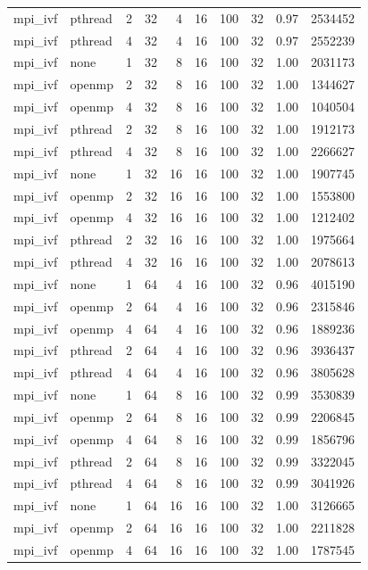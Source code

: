 \documentclass[a4paper]{article}
\begin{document}
{\begin{longtable}{lllrrrrrrr}
mpi\_ivf & pthread & 2 & 32 & 4 & 16 & 100 & 32 & 0.97 & 2534452 \\
mpi\_ivf & pthread & 4 & 32 & 4 & 16 & 100 & 32 & 0.97 & 2552239 \\
mpi\_ivf & none & 1 & 32 & 8 & 16 & 100 & 32 & 1.00 & 2031173 \\
mpi\_ivf & openmp & 2 & 32 & 8 & 16 & 100 & 32 & 1.00 & 1344627 \\
mpi\_ivf & openmp & 4 & 32 & 8 & 16 & 100 & 32 & 1.00 & 1040504 \\
mpi\_ivf & pthread & 2 & 32 & 8 & 16 & 100 & 32 & 1.00 & 1912173 \\
mpi\_ivf & pthread & 4 & 32 & 8 & 16 & 100 & 32 & 1.00 & 2266627 \\
mpi\_ivf & none & 1 & 32 & 16 & 16 & 100 & 32 & 1.00 & 1907745 \\
mpi\_ivf & openmp & 2 & 32 & 16 & 16 & 100 & 32 & 1.00 & 1553800 \\
mpi\_ivf & openmp & 4 & 32 & 16 & 16 & 100 & 32 & 1.00 & 1212402 \\
mpi\_ivf & pthread & 2 & 32 & 16 & 16 & 100 & 32 & 1.00 & 1975664 \\
mpi\_ivf & pthread & 4 & 32 & 16 & 16 & 100 & 32 & 1.00 & 2078613 \\
mpi\_ivf & none & 1 & 64 & 4 & 16 & 100 & 32 & 0.96 & 4015190 \\
mpi\_ivf & openmp & 2 & 64 & 4 & 16 & 100 & 32 & 0.96 & 2315846 \\
mpi\_ivf & openmp & 4 & 64 & 4 & 16 & 100 & 32 & 0.96 & 1889236 \\
mpi\_ivf & pthread & 2 & 64 & 4 & 16 & 100 & 32 & 0.96 & 3936437 \\
mpi\_ivf & pthread & 4 & 64 & 4 & 16 & 100 & 32 & 0.96 & 3805628 \\
mpi\_ivf & none & 1 & 64 & 8 & 16 & 100 & 32 & 0.99 & 3530839 \\
mpi\_ivf & openmp & 2 & 64 & 8 & 16 & 100 & 32 & 0.99 & 2206845 \\
mpi\_ivf & openmp & 4 & 64 & 8 & 16 & 100 & 32 & 0.99 & 1856796 \\
mpi\_ivf & pthread & 2 & 64 & 8 & 16 & 100 & 32 & 0.99 & 3322045 \\
mpi\_ivf & pthread & 4 & 64 & 8 & 16 & 100 & 32 & 0.99 & 3041926 \\
mpi\_ivf & none & 1 & 64 & 16 & 16 & 100 & 32 & 1.00 & 3126665 \\
mpi\_ivf & openmp & 2 & 64 & 16 & 16 & 100 & 32 & 1.00 & 2211828 \\
mpi\_ivf & openmp & 4 & 64 & 16 & 16 & 100 & 32 & 1.00 & 1787545 \\

\end{longtable}}
\end{document}

